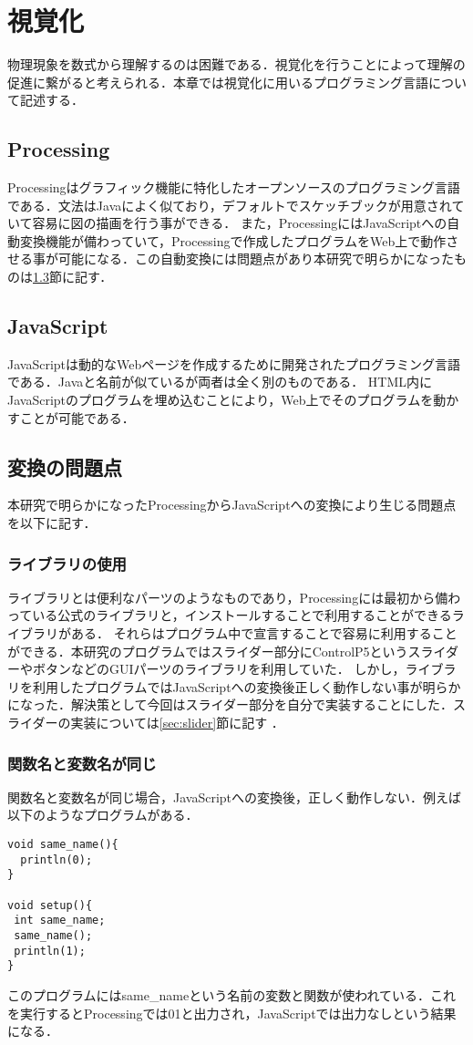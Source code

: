 

\chapter{視覚化}
物理現象を数式から理解するのは困難である．視覚化を行うことによって理解の促進に繋がると考えられる．本章では視覚化に用いるプログラミング言語について記述する．
\section{Processing}
Processingはグラフィック機能に特化したオープンソースのプログラミング言語である．文法はJavaによく似ており，デフォルトでスケッチブックが用意されていて容易に図の描画を行う事ができる．
また，ProcessingにはJavaScriptへの自動変換機能が備わっていて，Processingで作成したプログラムをWeb上で動作させる事が可能になる．この自動変換には問題点があり本研究で明らかになったものは\ref{sec:problem}節に記す．

\section{JavaScript}
JavaScriptは動的なWebページを作成するために開発されたプログラミング言語である．Javaと名前が似ているが両者は全く別のものである．
HTML内にJavaScriptのプログラムを埋め込むことにより，Web上でそのプログラムを動かすことが可能である．

\section{変換の問題点}\label{sec:problem}
本研究で明らかになったProcessingからJavaScriptへの変換により生じる問題点を以下に記す．

\subsection{ライブラリの使用}
ライブラリとは便利なパーツのようなものであり，Processingには最初から備わっている公式のライブラリと，インストールすることで利用することができるライブラリがある．
それらはプログラム中で宣言することで容易に利用することができる．本研究のプログラムではスライダー部分にControlP5というスライダーやボタンなどのGUIパーツのライブラリを利用していた．
しかし，ライブラリを利用したプログラムではJavaScriptへの変換後正しく動作しない事が明らかになった．解決策として今回はスライダー部分を自分で実装することにした．スライダーの実装については\ref{sec:slider}節に記す ．
\subsection{関数名と変数名が同じ}
関数名と変数名が同じ場合，JavaScriptへの変換後，正しく動作しない．例えば以下のようなプログラムがある．
\begin{screen}
{\small
\begin{verbatim}
void same_name(){
  println(0);
}

void setup(){
 int same_name;
 same_name();
 println(1);  
}
\end{verbatim}}
\end{screen}
このプログラムにはsame\_nameという名前の変数と関数が使われている．これを実行するとProcessingでは01と出力され，JavaScriptでは出力なしという結果になる．


